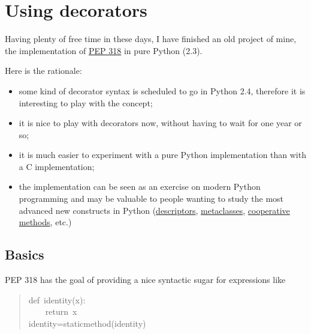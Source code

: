 \documentclass[11pt,english]{article}
\begin{document}

\hypertarget{using-decorators}{}
\section*{Using decorators}

Having plenty of free time in these days, I have finished an old 
project of mine, the implementation of \href{http://www.python.org/pep}{PEP 318} in pure Python
(2.3).

Here is the rationale:
\begin{itemize}
\item 
some kind of decorator syntax is scheduled to go in Python 2.4,
therefore it is interesting to play with the concept;

\item 
it is nice to play with decorators now, without having to
wait for one year or so;

\item 
it is much easier to experiment with a pure Python implementation
than with a C implementation;

\item 
the implementation can be seen as an exercise on modern Python
programming and may be valuable to people wanting to study the most
advanced new constructs in Python (\href{http://users.rcn.com/python/download/Descriptor.htm}{descriptors}, \href{http://www-106.ibm.com/developerworks/library/l-pymeta2.html}{metaclasses}, 
\href{http://www.python.org/2.3/descrintro.html}{cooperative methods}, etc.)

\end{itemize}



\hypertarget{basics}{}
\subsection*{Basics}

PEP 318 has the goal of providing a nice syntactic sugar for expressions like
\begin{quote}
\begin{ttfamily}\begin{flushleft}
\mbox{def~identity(x):}\\
\mbox{~~~~return~x}\\
\mbox{identity=staticmethod(identity)}
\end{flushleft}\end{ttfamily}
\end{quote}
\end{document}
